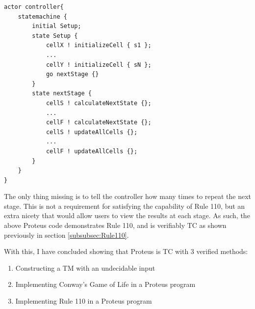 \begin{verbatim}
actor controller{
    statemachine {
        initial Setup;
        state Setup {
            cellX ! initializeCell { s1 };
            ...
            cellY ! initializeCell { sN };
            go nextStage {}
        }
        state nextStage {
            cellS ! calculateNextState {};
            ...
            cellF ! calculateNextState {};
            cellS ! updateAllCells {};
            ...
            cellF ! updateAllCells {};
        }
    }
}
\end{verbatim}

The only thing missing is to tell the controller how many times to repeat the next stage.
This is not a requirement for satisfying the capability of Rule 110, but an extra nicety that would allow users to view the results at each stage.
As such, the above Proteus code demonstrates Rule 110, and is verifiably TC as shown previously in section \ref{subsubsec:Rule110}.

With this, I have concluded showing that Proteus is TC with 3 verified methods:
\begin{enumerate}
    \item Constructing a TM with an undecidable input
    \item Implementing Conway's Game of Life in a Proteus program
    \item Implementing Rule 110 in a Proteus program
\end{enumerate}